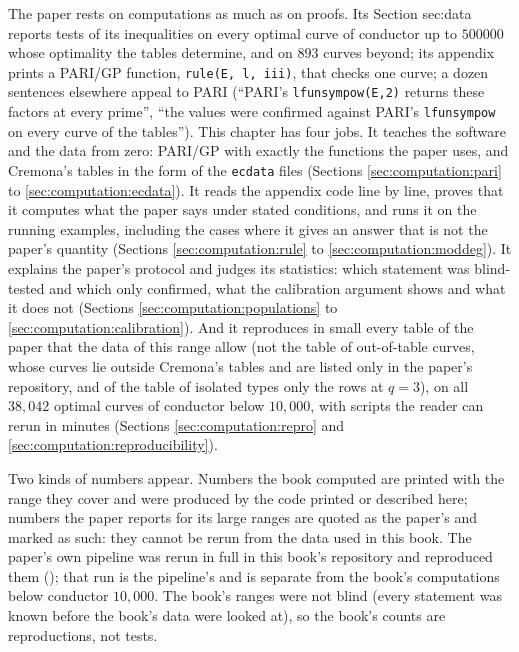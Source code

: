 \begin{sloppypar}
The paper rests on computations as much as on proofs. Its Section sec:data reports tests of its inequalities on every optimal curve of conductor up to $500000$ whose
optimality the tables determine, and on $893$ curves beyond; its appendix prints a PARI/GP function, \texttt{rule(E, l, iii)}, that checks one curve; a dozen sentences elsewhere appeal to
PARI (``PARI's \texttt{lfunsympow(E,2)} returns these factors at every prime'', ``the values were confirmed against PARI's
\texttt{lfunsympow} on every curve of the tables''). This chapter has four jobs. It teaches the software and the data from zero: PARI/GP
with exactly the functions the paper uses, and Cremona's tables in the form of the \texttt{ecdata} files (Sections
\ref{sec:computation:pari} to \ref{sec:computation:ecdata}). It reads the appendix code line by line, proves that it computes what the paper
says under stated conditions, and runs it on the running examples, including the cases where it gives an answer that is not the paper's
quantity (Sections \ref{sec:computation:rule} to \ref{sec:computation:moddeg}). It explains the paper's protocol and judges its statistics:
which statement was blind-tested and which only confirmed, what the calibration argument shows and what it does not
(Sections \ref{sec:computation:populations} to \ref{sec:computation:calibration}). And it reproduces in small every table of the paper that the data of this range allow (not the table of
out-of-table curves, whose curves lie outside Cremona's tables and are listed only in the paper's repository, and of the table of isolated types only the rows at $q=3$), on all
$38{,}042$ optimal curves of conductor below $10{,}000$, with scripts the reader can rerun in minutes (Sections \ref{sec:computation:repro}
and \ref{sec:computation:reproducibility}).

Two kinds of numbers appear. Numbers the book computed are printed with the range they cover and were produced by the code printed or
described here; numbers the paper reports for its large ranges are quoted as the paper's and marked as such: they cannot be rerun from the
data used in this book. The paper's own pipeline was rerun in full in this book's repository and reproduced them
(); that run is the pipeline's and is separate from the book's computations below conductor $10{,}000$. The book's ranges were not blind (every statement was known before the book's data were looked at), so the book's
counts are reproductions, not tests.


\end{sloppypar}
